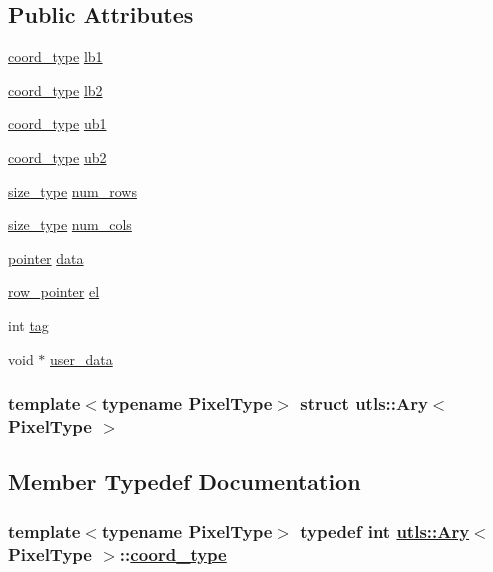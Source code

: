 \subsection*{Public Attributes}
\begin{CompactItemize}
\item 
\hyperlink{structutls_1_1Ary_907420b899d180bd0ae87c3995316f18}{coord\_\-type} \hyperlink{structutls_1_1Ary_2cfc3bd4977117dc851cdaae635aa245}{lb1}
\item 
\hyperlink{structutls_1_1Ary_907420b899d180bd0ae87c3995316f18}{coord\_\-type} \hyperlink{structutls_1_1Ary_b6147e63dabd77b245d6bc9ec976453d}{lb2}
\item 
\hyperlink{structutls_1_1Ary_907420b899d180bd0ae87c3995316f18}{coord\_\-type} \hyperlink{structutls_1_1Ary_8c54df43b278c0d681f840b8af05b12c}{ub1}
\item 
\hyperlink{structutls_1_1Ary_907420b899d180bd0ae87c3995316f18}{coord\_\-type} \hyperlink{structutls_1_1Ary_c8672393bfae42004b996ca631755181}{ub2}
\item 
\hyperlink{structutls_1_1Ary_8811de4f35f83e989511aaddf003376c}{size\_\-type} \hyperlink{structutls_1_1Ary_cf02710b9f8fc2b8b17f0c49e1590256}{num\_\-rows}
\item 
\hyperlink{structutls_1_1Ary_8811de4f35f83e989511aaddf003376c}{size\_\-type} \hyperlink{structutls_1_1Ary_98c4da3759918633b2030ae2cbad3939}{num\_\-cols}
\item 
\hyperlink{structutls_1_1Ary_9eb735fe995ca9b5faaef9b176a08583}{pointer} \hyperlink{structutls_1_1Ary_b81d2c654c158ec22caf28760e40ba88}{data}
\item 
\hyperlink{structutls_1_1Ary_d8034949f0a70efaf950686c9cd7e7ea}{row\_\-pointer} \hyperlink{structutls_1_1Ary_c0088e9634850c0f123ab944550a6626}{el}
\item 
int \hyperlink{structutls_1_1Ary_0b9cc006bf82036676e2bfa0d7cc2b9e}{tag}
\item 
void $\ast$ \hyperlink{structutls_1_1Ary_7e91c5694fe2b59ce33d798551739ab8}{user\_\-data}
\end{CompactItemize}
\subsubsection*{template$<$typename Pixel\-Type$>$ struct utls::Ary$<$ Pixel\-Type $>$}



\subsection{Member Typedef Documentation}
\hypertarget{structutls_1_1Ary_907420b899d180bd0ae87c3995316f18}{
\subsubsection[coord\_\-type]{\setlength{\rightskip}{0pt plus 5cm}template$<$typename Pixel\-Type$>$ typedef int \hyperlink{structutls_1_1Ary}{utls::Ary}$<$ Pixel\-Type $>$::\hyperlink{structutls_1_1Ary_907420b899d180bd0ae87c3995316f18}{coord\_\-type}}}
\label{structutls_1_1Ary_907420b899d180bd0ae87c3995316f18}


